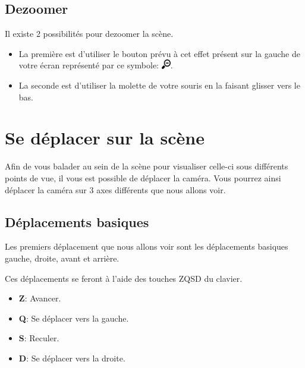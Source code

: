 \documentclass[11pt]{report}
\begin{document}
\subsection{Dezoomer}

\hypertarget{dezoom}{Il existe 2 possibilités pour dezoomer la scène.}

\begin{itemize}
        \item La première est d'utiliser le bouton prévu à cet effet présent sur la gauche de votre écran représenté par ce symbole: \includegraphics[width=0.4cm]{./btn_zoom-out.png}.
        \item La seconde est d'utiliser la molette de votre souris en la faisant glisser vers le bas.
\end{itemize}



\section{Se déplacer sur la scène}

Afin de vous balader au sein de la scène pour visualiser celle-ci sous différents points de vue, il vous est possible de déplacer la caméra. Vous pourrez ainsi déplacer la caméra sur 3 axes différents que nous allons voir.


\subsection{Déplacements basiques}

\hypertarget{move}{Les premiers déplacement que nous allons voir sont les déplacements basiques gauche, droite, avant et arrière.} Ces déplacements se feront à l'aide des touches ZQSD du clavier.

\begin{itemize}
  \item \textbf{Z}: Avancer.
  \item \textbf{Q}: Se déplacer vers la gauche.
  \item \textbf{S}: Reculer.
  \item \textbf{D}: Se déplacer vers la droite.
\end{itemize}
\end{document}
